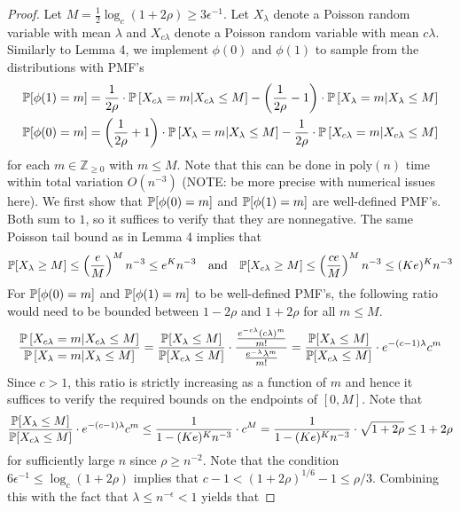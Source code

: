 \documentclass[11pt]{article}
\begin{document}
\begin{proof}
Let $M = \frac{1}{2} \log_c (1 + 2\rho) \ge 3\epsilon^{-1}$. Let $X_\lambda$ denote a Poisson random variable with mean $\lambda$ and $X_{c\lambda}$ denote a Poisson random variable with mean $c \lambda$. Similarly to Lemma 4, we implement $\phi(0)$ and $\phi(1)$ to sample from the distributions with PMF's
\begin{align*}
\mathbb{P}[\phi(1) = m] &= \frac{1}{2\rho} \cdot \mathbb{P}\left[X_{c\lambda} = m | X_{c\lambda} \le M \right] - \left( \frac{1}{2\rho} - 1 \right) \cdot \mathbb{P}\left[X_{\lambda} = m | X_{\lambda} \le M \right] \\
\mathbb{P}[\phi(0) = m] &= \left( \frac{1}{2\rho} + 1 \right) \cdot \mathbb{P}\left[X_{\lambda} = m | X_{\lambda} \le M \right] - \frac{1}{2\rho} \cdot \mathbb{P}\left[X_{c\lambda} = m | X_{c\lambda} \le M \right]
\end{align*}
for each $m \in \mathbb{Z}_{\ge 0}$ with $m \le M$. Note that this can be done in $\text{poly}(n)$ time within total variation $O(n^{-3})$ (NOTE: be more precise with numerical issues here). We first show that $\mathbb{P}[\phi(0) = m]$ and $\mathbb{P}[\phi(1) = m]$ are well-defined PMF's. Both sum to $1$, so it suffices to verify that they are nonnegative. The same Poisson tail bound as in Lemma 4 implies that
$$\mathbb{P}[X_{\lambda} \ge M] \le \left(\frac{e}{M} \right)^M n^{-3} \le e^K n^{-3} \quad \text{and} \quad \mathbb{P}[X_{c\lambda} \ge M] \le \left(\frac{ce}{M} \right)^M n^{-3} \le (Ke)^K n^{-3}$$
For $\mathbb{P}[\phi(0) = m]$ and $\mathbb{P}[\phi(1) = m]$ to be well-defined PMF's, the following ratio would need to be bounded between $1 - 2\rho$ and $1 + 2\rho$ for all $m \le M$.
$$\frac{\mathbb{P}\left[X_{c\lambda} = m | X_{c\lambda} \le M \right]}{\mathbb{P}\left[X_{\lambda} = m | X_{\lambda} \le M \right]} = \frac{\mathbb{P}[X_\lambda \le M]}{\mathbb{P}[X_{c\lambda} \le M]} \cdot \frac{\frac{e^{-c\lambda} (c\lambda)^m}{m!}}{\frac{e^{-\lambda} \lambda^m}{m!}} = \frac{\mathbb{P}[X_\lambda \le M]}{\mathbb{P}[X_{c\lambda} \le M]} \cdot e^{-(c - 1)\lambda} c^m$$
Since $c > 1$, this ratio is strictly increasing as a function of $m$ and hence it suffices to verify the required bounds on the endpoints of $[0, M]$. Note that
$$\frac{\mathbb{P}[X_\lambda \le M]}{\mathbb{P}[X_{c\lambda} \le M]} \cdot e^{-(c - 1)\lambda} c^m \le \frac{1}{1 - (Ke)^K n^{-3}} \cdot c^M = \frac{1}{1 - (Ke)^K n^{-3}} \cdot \sqrt{1 + 2\rho} \le 1 + 2\rho$$
for sufficiently large $n$ since $\rho \ge n^{-2}$. Note that the condition $6\epsilon^{-1} \le \log_c(1 + 2 \rho)$ implies that $c - 1 < (1 + 2\rho)^{1/6} - 1 \le \rho/3$. Combining this with the fact that $\lambda \le n^{-\epsilon} < 1$ yields that

\end{proof}
\end{document}
